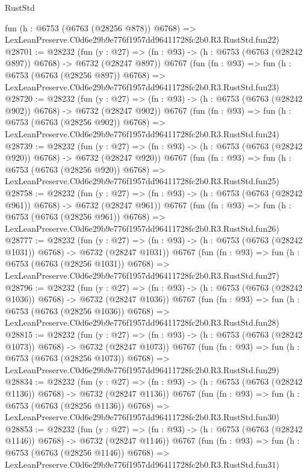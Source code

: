 \begin{lexlean}{RustStd}
\begin{coremodule}
    fun (h : @6753 (@6763 (@28256 @878)) @6768) =>
    LexLeanPreserve.C0d6e29b9e776f1957dd96411728fc2b0.R3.RustStd.fun22)
@28701 := @28232
    (fun (y : @27) => (fn : @93) -> (h : @6753 (@6763 (@28242 @897)) @6768) -> @6732 (@28247 @897))
    @6767
    (fun (fn : @93) =>
    fun (h : @6753 (@6763 (@28256 @897)) @6768) =>
    LexLeanPreserve.C0d6e29b9e776f1957dd96411728fc2b0.R3.RustStd.fun23)
@28720 := @28232
    (fun (y : @27) => (fn : @93) -> (h : @6753 (@6763 (@28242 @902)) @6768) -> @6732 (@28247 @902))
    @6767
    (fun (fn : @93) =>
    fun (h : @6753 (@6763 (@28256 @902)) @6768) =>
    LexLeanPreserve.C0d6e29b9e776f1957dd96411728fc2b0.R3.RustStd.fun24)
@28739 := @28232
    (fun (y : @27) => (fn : @93) -> (h : @6753 (@6763 (@28242 @920)) @6768) -> @6732 (@28247 @920))
    @6767
    (fun (fn : @93) =>
    fun (h : @6753 (@6763 (@28256 @920)) @6768) =>
    LexLeanPreserve.C0d6e29b9e776f1957dd96411728fc2b0.R3.RustStd.fun25)
@28758 := @28232
    (fun (y : @27) => (fn : @93) -> (h : @6753 (@6763 (@28242 @961)) @6768) -> @6732 (@28247 @961))
    @6767
    (fun (fn : @93) =>
    fun (h : @6753 (@6763 (@28256 @961)) @6768) =>
    LexLeanPreserve.C0d6e29b9e776f1957dd96411728fc2b0.R3.RustStd.fun26)
@28777 := @28232
    (fun (y : @27) =>
    (fn : @93) -> (h : @6753 (@6763 (@28242 @1031)) @6768) -> @6732 (@28247 @1031))
    @6767
    (fun (fn : @93) =>
    fun (h : @6753 (@6763 (@28256 @1031)) @6768) =>
    LexLeanPreserve.C0d6e29b9e776f1957dd96411728fc2b0.R3.RustStd.fun27)
@28796 := @28232
    (fun (y : @27) =>
    (fn : @93) -> (h : @6753 (@6763 (@28242 @1036)) @6768) -> @6732 (@28247 @1036))
    @6767
    (fun (fn : @93) =>
    fun (h : @6753 (@6763 (@28256 @1036)) @6768) =>
    LexLeanPreserve.C0d6e29b9e776f1957dd96411728fc2b0.R3.RustStd.fun28)
@28815 := @28232
    (fun (y : @27) =>
    (fn : @93) -> (h : @6753 (@6763 (@28242 @1073)) @6768) -> @6732 (@28247 @1073))
    @6767
    (fun (fn : @93) =>
    fun (h : @6753 (@6763 (@28256 @1073)) @6768) =>
    LexLeanPreserve.C0d6e29b9e776f1957dd96411728fc2b0.R3.RustStd.fun29)
@28834 := @28232
    (fun (y : @27) =>
    (fn : @93) -> (h : @6753 (@6763 (@28242 @1136)) @6768) -> @6732 (@28247 @1136))
    @6767
    (fun (fn : @93) =>
    fun (h : @6753 (@6763 (@28256 @1136)) @6768) =>
    LexLeanPreserve.C0d6e29b9e776f1957dd96411728fc2b0.R3.RustStd.fun30)
@28853 := @28232
    (fun (y : @27) =>
    (fn : @93) -> (h : @6753 (@6763 (@28242 @1146)) @6768) -> @6732 (@28247 @1146))
    @6767
    (fun (fn : @93) =>
    fun (h : @6753 (@6763 (@28256 @1146)) @6768) =>
    LexLeanPreserve.C0d6e29b9e776f1957dd96411728fc2b0.R3.RustStd.fun31)

\end{coremodule}
\end{lexlean}
